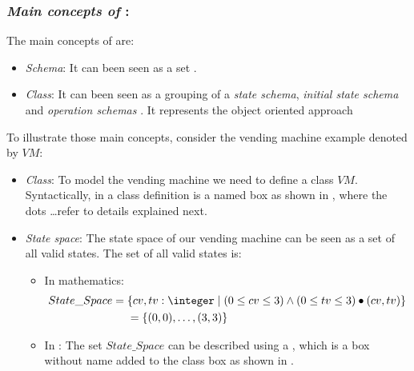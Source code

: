 \subsubsection{\textit{Main concepts of \oz{}}:} 
\label{main_concepts_oz} 
The main concepts of \oz{} are:
\begin{itemize}
\item \textit{Schema}: It can been seen as a set \cite{woodcock}.
\item \textit{Class}: It can been seen as a grouping of a \textit{state schema}, \textit{initial state schema} and \textit{operation schemas} \cite{kenji}. It represents the object oriented approach 
\end{itemize}
To illustrate those main concepts, consider the vending machine example denoted by $VM$:
\begin{itemize}
\item \textit{Class}: To model the vending machine we need to define a class $VM$. Syntactically, in \oz{}
a class definition is a named box as shown in , where the dots \dots refer to details explained next.


\item \textit{State space}: The state space of our vending machine can be seen as a set of all valid states. The set of all valid states is:
\begin{itemize}
\item In mathematics:
\begin{equation*}
\begin{aligned}
State\_Space ={} & \{cv,tv: \integer\mid (0 \leq  cv \leq 3) \wedge
(0 \leq  tv \leq 3)\bullet(cv,tv)\}\\
      & =\{\pair{0}{0},\dots,\pair{3}{3}\}
\end{aligned}
\end{equation*}
\item In \oz{}: The set $State\_Space$ can be described using a , which is a box without name added to the class box as shown in .
\end{itemize}



\end{itemize}
